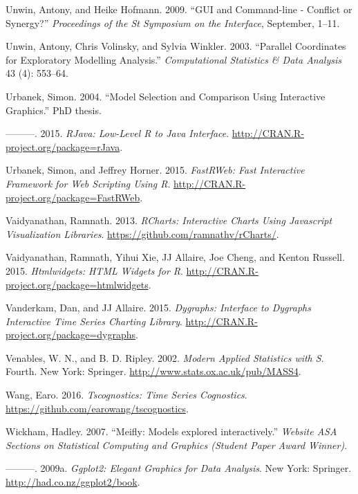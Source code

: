 \documentclass[12pt,]{isuthesis}
\begin{document}
\hypertarget{ref-Unwin:1999vp}{}
Unwin, Antony, and Heike Hofmann. 2009. ``GUI and Command-line -
Conflict or Synergy?'' \emph{Proceedings of the St Symposium on the
Interface}, September, 1--11.

\hypertarget{ref-Unwin:2003uy}{}
Unwin, Antony, Chris Volinsky, and Sylvia Winkler. 2003. ``Parallel
Coordinates for Exploratory Modelling Analysis.'' \emph{Computational
Statistics \& Data Analysis} 43 (4): 553--64.

\hypertarget{ref-Urbanek:2004}{}
Urbanek, Simon. 2004. ``Model Selection and Comparison Using Interactive
Graphics.'' PhD thesis.

\hypertarget{ref-rJava}{}
---------. 2015. \emph{RJava: Low-Level R to Java Interface}.
\url{http://CRAN.R-project.org/package=rJava}.

\hypertarget{ref-FastRWeb}{}
Urbanek, Simon, and Jeffrey Horner. 2015. \emph{FastRWeb: Fast
Interactive Framework for Web Scripting Using R}.
\url{http://CRAN.R-project.org/package=FastRWeb}.

\hypertarget{ref-rCharts}{}
Vaidyanathan, Ramnath. 2013. \emph{RCharts: Interactive Charts Using
Javascript Visualization Libraries}.
\url{https://github.com/ramnathv/rCharts/}.

\hypertarget{ref-htmlwidgets}{}
Vaidyanathan, Ramnath, Yihui Xie, JJ Allaire, Joe Cheng, and Kenton
Russell. 2015. \emph{Htmlwidgets: HTML Widgets for R}.
\url{http://CRAN.R-project.org/package=htmlwidgets}.

\hypertarget{ref-dygraphs}{}
Vanderkam, Dan, and JJ Allaire. 2015. \emph{Dygraphs: Interface to
Dygraphs Interactive Time Series Charting Library}.
\url{http://CRAN.R-project.org/package=dygraphs}.

\hypertarget{ref-MASS}{}
Venables, W. N., and B. D. Ripley. 2002. \emph{Modern Applied Statistics
with S}. Fourth. New York: Springer.
\url{http://www.stats.ox.ac.uk/pub/MASS4}.

\hypertarget{ref-tscognostics}{}
Wang, Earo. 2016. \emph{Tscognostics: Time Series Cognostics}.
\url{https://github.com/earowang/tscognostics}.

\hypertarget{ref-Wickham:2007wq}{}
Wickham, Hadley. 2007. ``Meifly: Models explored interactively.''
\emph{Website ASA Sections on Statistical Computing and Graphics
(Student Paper Award Winner)}.

\hypertarget{ref-ggplot2}{}
---------. 2009a. \emph{Ggplot2: Elegant Graphics for Data Analysis}.
New York: Springer. \url{http://had.co.nz/ggplot2/book}.
\end{document}
